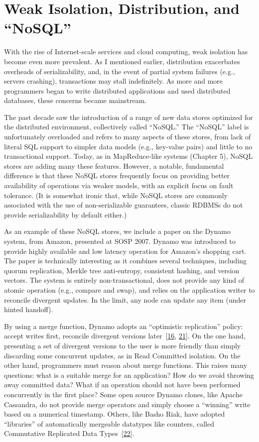 \documentclass[b5paper,11pt,twoside,openright]{book}
\newcommand\Section[2]{
  \hypertarget{#1}{
    \section{#2}\label{#1}
  }
}
\begin{document}
\Section{weak-isolation-distribution-and-nosql}{%
Weak Isolation, Distribution, and ``NoSQL''
}

With the rise of Internet-scale services and cloud computing, weak
isolation has become even more prevalent. As I mentioned earlier,
distribution exacerbates overheads of serializability, and, in the event
of partial system failures (e.g., servers crashing), transactions may
stall indefinitely. As more and more programmers began to write
distributed applications and used distributed databases, these concerns
became mainstream.

The past decade saw the introduction of a range of new data stores
optimized for the distributed environment, collectively called
``NoSQL.'' The ``NoSQL'' label is unfortunately overloaded and refers to
many aspects of these stores, from lack of literal SQL support to
simpler data models (e.g., key-value pairs) and little to no
transactional support. Today, as in MapReduce-like systems (Chapter 5),
NoSQL stores are adding many these features. However, a notable,
fundamental difference is that these NoSQL stores frequently focus on
providing better availability of operations via weaker models, with an
explicit focus on fault tolerance. (It is somewhat ironic that, while
NoSQL stores are commonly associated with the use of non-serializable
guarantees, classic RDBMSs do not provide serializability by default
either.)

As an example of these NoSQL stores, we include a paper on the Dynamo
system, from Amazon, presented at SOSP 2007. Dynamo was introduced to
provide highly available and low latency operation for Amazon's shopping
cart. The paper is technically interesting as it combines several
techniques, including quorum replication, Merkle tree anti-entropy,
consistent hashing, and version vectors. The system is entirely
non-transactional, does not provide any kind of atomic operation (e.g.,
compare and swap), and relies on the application writer to reconcile
divergent updates. In the limit, any node can update any item (under
hinted handoff).

By using a merge function, Dynamo adopts an ``optimistic replication''
policy: accept writes first, reconcile divergent versions
later~{{[}\protect\hyperlink{ref-gray-dangers}{16},
  \protect\hyperlink{ref-optimistic}{21}{]}}. On the one hand, presenting
a set of divergent versions to the user is more friendly than simply
discarding some concurrent updates, as in Read Committed isolation. On
the other hand, programmers must reason about merge functions. This
raises many questions: what is a suitable merge for an application? How
do we avoid throwing away committed data? What if an operation should
not have been performed concurrently in the first place? Some open
source Dynamo clones, like Apache Cassandra, do not provide merge
operators and simply choose a ``winning'' write based on a numerical
timestamp. Others, like Basho Riak, have adopted ``libraries'' of
automatically mergeable datatypes like counters, called Commutative
Replicated Data Types~{{[}\protect\hyperlink{ref-crdt}{22}{]}}.
\end{document}
